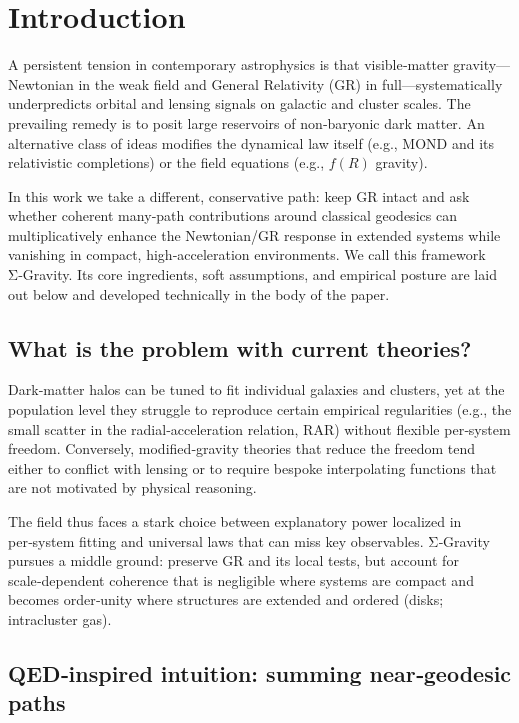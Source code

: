 \documentclass[11pt,a4paper]{article}
\begin{document}
\section{Introduction}


A persistent tension in contemporary astrophysics is that visible‑matter gravity—Newtonian in the weak field and General Relativity (GR) in full—systematically underpredicts orbital and lensing signals on galactic and cluster scales. The prevailing remedy is to posit large reservoirs of non‑baryonic dark matter. An alternative class of ideas modifies the dynamical law itself (e.g., MOND and its relativistic completions) or the field equations (e.g., $f(R)$ gravity). 


In this work we take a different, conservative path: keep GR intact and ask whether coherent many‑path contributions around classical geodesics can multiplicatively enhance the Newtonian/GR response in extended systems while vanishing in compact, high‑acceleration environments. We call this framework Σ‑Gravity. Its core ingredients, soft assumptions, and empirical posture are laid out below and developed technically in the body of the paper.


\subsection{What is the problem with current theories?}


Dark‑matter halos can be tuned to fit individual galaxies and clusters, yet at the population level they struggle to reproduce certain empirical regularities (e.g., the small scatter in the radial‑acceleration relation, RAR) without flexible per‑system freedom. Conversely, modified‑gravity theories that reduce the freedom tend either to conflict with lensing or to require bespoke interpolating functions that are not motivated by physical reasoning. 


The field thus faces a stark choice between explanatory power localized in per‑system fitting and universal laws that can miss key observables. Σ‑Gravity pursues a middle ground: preserve GR and its local tests, but account for scale‑dependent coherence that is negligible where systems are compact and becomes order‑unity where structures are extended and ordered (disks; intracluster gas).


\subsection{QED‑inspired intuition: summing near‑geodesic paths}
\end{document}
